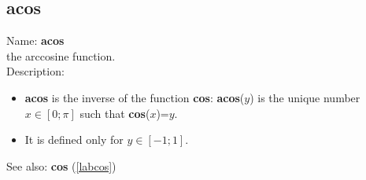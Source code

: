 \subsection{acos}
\label{labacos}
\noindent Name: \textbf{acos}\\
the arccosine function.\\
\noindent Description: \begin{itemize}

\item \textbf{acos} is the inverse of the function \textbf{cos}: \textbf{acos}($y$) is the unique number 
   $x \in [0; \pi]$ such that \textbf{cos}($x$)=$y$.

\item It is defined only for $y \in [-1;1]$.
\end{itemize}
See also: \textbf{cos} (\ref{labcos})
